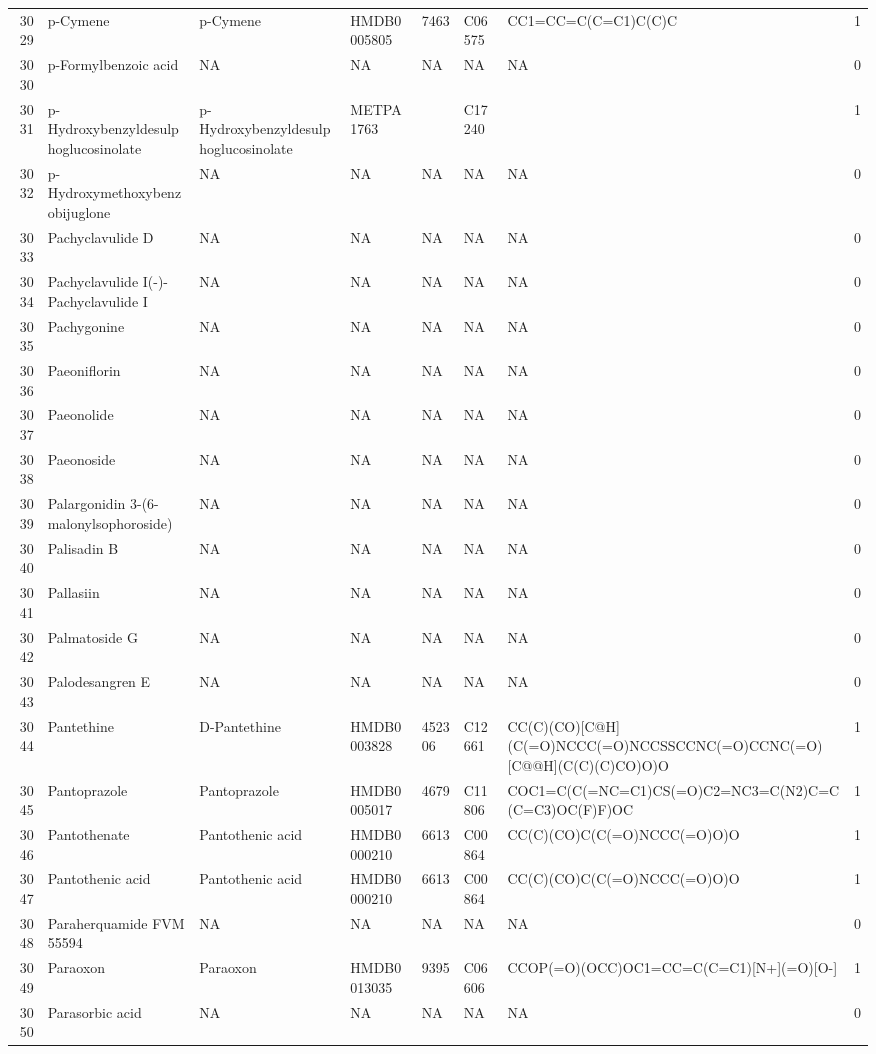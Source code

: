 \documentclass[a4paper]{article}
\begin{document}
\begin{longtable}{rlllllll}
  3029 & p-Cymene & p-Cymene & HMDB0005805 & 7463 & C06575 & CC1=CC=C(C=C1)C(C)C & 1 \\ 
  3030 & p-Formylbenzoic acid & NA & NA & NA & NA & NA & 0 \\ 
  3031 & p-Hydroxybenzyldesulphoglucosinolate & p-Hydroxybenzyldesulphoglucosinolate & METPA1763 &  & C17240 &  & 1 \\ 
  3032 & p-Hydroxymethoxybenzobijuglone & NA & NA & NA & NA & NA & 0 \\ 
  3033 & Pachyclavulide D & NA & NA & NA & NA & NA & 0 \\ 
  3034 & Pachyclavulide I(-)-Pachyclavulide I & NA & NA & NA & NA & NA & 0 \\ 
  3035 & Pachygonine & NA & NA & NA & NA & NA & 0 \\ 
  3036 & Paeoniflorin & NA & NA & NA & NA & NA & 0 \\ 
  3037 & Paeonolide & NA & NA & NA & NA & NA & 0 \\ 
  3038 & Paeonoside & NA & NA & NA & NA & NA & 0 \\ 
  3039 & Palargonidin 3-(6-malonylsophoroside) & NA & NA & NA & NA & NA & 0 \\ 
  3040 & Palisadin B & NA & NA & NA & NA & NA & 0 \\ 
  3041 & Pallasiin & NA & NA & NA & NA & NA & 0 \\ 
  3042 & Palmatoside G & NA & NA & NA & NA & NA & 0 \\ 
  3043 & Palodesangren E & NA & NA & NA & NA & NA & 0 \\ 
  3044 & Pantethine & D-Pantethine & HMDB0003828 & 452306 & C12661 & CC(C)(CO)[C@H](C(=O)NCCC(=O)NCCSSCCNC(=O)CCNC(=O)[C@@H](C(C)(C)CO)O)O & 1 \\ 
  3045 & Pantoprazole & Pantoprazole & HMDB0005017 & 4679 & C11806 & COC1=C(C(=NC=C1)CS(=O)C2=NC3=C(N2)C=C(C=C3)OC(F)F)OC & 1 \\ 
  3046 & Pantothenate & Pantothenic acid & HMDB0000210 & 6613 & C00864 & CC(C)(CO)C(C(=O)NCCC(=O)O)O & 1 \\ 
  3047 & Pantothenic acid & Pantothenic acid & HMDB0000210 & 6613 & C00864 & CC(C)(CO)C(C(=O)NCCC(=O)O)O & 1 \\ 
  3048 & Paraherquamide FVM 55594 & NA & NA & NA & NA & NA & 0 \\ 
  3049 & Paraoxon & Paraoxon & HMDB0013035 & 9395 & C06606 & CCOP(=O)(OCC)OC1=CC=C(C=C1)[N+](=O)[O-] & 1 \\ 
  3050 & Parasorbic acid & NA & NA & NA & NA & NA & 0 \\ 

\end{longtable}
\end{document}
